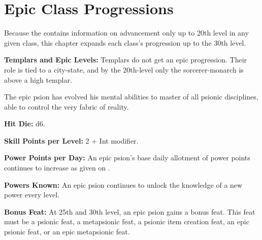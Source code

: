 \section{Epic Class Progressions}
Because the  contains information on advancement only up to 20th level in any given class, this chapter expands each class's progression up to the 30th level.

\textbf{Templars and Epic Levels:} Templars do not get an epic progression. Their role is tied to a city-state, and by the 20th-level only the sorcerer-monarch is above a high templar.








The epic psion has evolved his mental abilities to master of all psionic disciplines, able to control the very fabric of reality.

\textbf{Hit Die:} d6.

\textbf{Skill Points per Level:} 2 + Int modifier.

\textbf{Power Points per Day:} An epic psion's base daily allotment of power points continues to increase as given on .

\textbf{Powers Known:} An epic psion continues to unlock the knowledge of a new power every level.

\textbf{Bonus Feat:} At 25th and 30th level, an epic psion gains a bonus feat. This feat must be a psionic feat, a metapsionic feat, a psionic item creation feat, an epic psionic feat, or an epic metapsionic feat.





